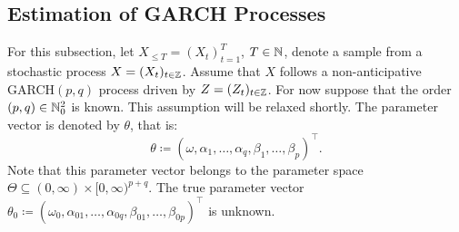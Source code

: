 \subsection{Estimation of GARCH Processes}\label{ss:estimation-garch}
For this subsection, let $X_{\leq T}=(X_{t})_{t=1}^{T}$, $T\in\mathbb{N}$, denote a sample from a stochastic process $X=(X_{t})_{t\in\mathbb{Z}}$. Assume that $X$ follows a non-anticipative GARCH$(p,q)$ process driven by $Z=(Z_{t})_{t\in\mathbb{Z}}$. For now suppose that the order $(p,q)\in\mathbb{N}_{0}^{2}$ is known. This assumption will be relaxed shortly. The parameter vector is denoted by $\theta$, that is:
\begin{equation}\label{eq:est-parvector}
    \theta\coloneqq(\omega,\alpha_{1},\dots,\alpha_{q},\beta_{1},\dots,\beta_{p})^{\top}.
\end{equation}
Note that this parameter vector belongs to the parameter space $\Theta\subseteq(0,\infty)\times[0,\infty)^{p+q}$. The true parameter vector $\theta_{0}\coloneqq(\omega_{0},\alpha_{01},\dots,\alpha_{0q},\beta_{01},\dots,\beta_{0p})^{\top}$ is unknown.

